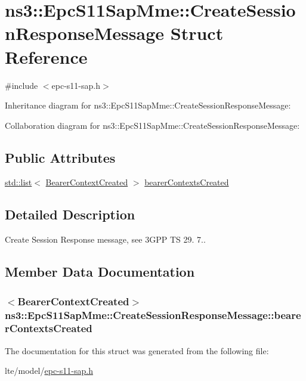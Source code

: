 \hypertarget{structns3_1_1EpcS11SapMme_1_1CreateSessionResponseMessage}{}\section{ns3\+:\+:Epc\+S11\+Sap\+Mme\+:\+:Create\+Session\+Response\+Message Struct Reference}
\label{structns3_1_1EpcS11SapMme_1_1CreateSessionResponseMessage}


{\ttfamily \#include $<$epc-\/s11-\/sap.\+h$>$}



Inheritance diagram for ns3\+:\+:Epc\+S11\+Sap\+Mme\+:\+:Create\+Session\+Response\+Message\+:


Collaboration diagram for ns3\+:\+:Epc\+S11\+Sap\+Mme\+:\+:Create\+Session\+Response\+Message\+:
\subsection*{Public Attributes}
\begin{DoxyCompactItemize}
\item 
\hyperlink{openflow-interface_8h_afd9bcfa176617760671b67580f536fa7}{std\+::list}$<$ \hyperlink{structns3_1_1EpcS11SapMme_1_1BearerContextCreated}{Bearer\+Context\+Created} $>$ \hyperlink{structns3_1_1EpcS11SapMme_1_1CreateSessionResponseMessage_a8dc20401165f12dcc06a6b026f4e3a98}{bearer\+Contexts\+Created}
\end{DoxyCompactItemize}


\subsection{Detailed Description}
Create Session Response message, see 3\+G\+PP TS 29. 7.. 

\subsection{Member Data Documentation}
\subsubsection[{\texorpdfstring{bearer\+Contexts\+Created}{bearerContextsCreated}}]{$<${\bf Bearer\+Context\+Created}$>$ ns3\+::\+Epc\+S11\+Sap\+Mme\+::\+Create\+Session\+Response\+Message\+::bearer\+Contexts\+Created}\hypertarget{structns3_1_1EpcS11SapMme_1_1CreateSessionResponseMessage_a8dc20401165f12dcc06a6b026f4e3a98}{}\label{structns3_1_1EpcS11SapMme_1_1CreateSessionResponseMessage_a8dc20401165f12dcc06a6b026f4e3a98}


The documentation for this struct was generated from the following file\+:\begin{DoxyCompactItemize}
\item 
lte/model/\hyperlink{epc-s11-sap_8h}{epc-\/s11-\/sap.\+h}\end{DoxyCompactItemize}
